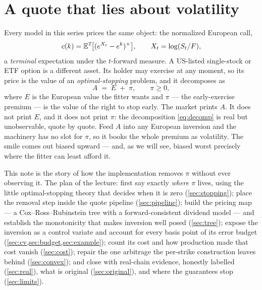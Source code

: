 \documentclass[11pt]{article}
\begin{document}
\newpage
\tableofcontents
\newpage

\section{A quote that lies about volatility}
\label{sec:problem}

Every model in this series prices the same object: the normalized
European call,
\begin{equation}
c(k)=\mathbb{E}^{T}\!\big[(e^{X_t}-e^{k})^+\big],\qquad
X_t=\log(S_t/F),
\label{eq:normcall}
\end{equation}
a \emph{terminal} expectation under the $t$-forward measure.  A US-listed
single-stock or ETF option is a different asset.  Its holder may exercise at
any moment, so its price is the value of an \emph{optimal-stopping} problem,
and it decomposes as
\begin{equation}
A \;=\; E \;+\; \pi,\qquad \pi\ge0,
\label{eq:decomp}
\end{equation}
where $E$ is the European value the fitter wants and $\pi$ --- the
early-exercise premium --- is the value of the right to stop early.  The
market prints $A$.  It does not print $E$, and it does not print $\pi$:
the decomposition \eqref{eq:decomp} is real but unobservable, quote by
quote.  Feed $A$ into any European inversion and the machinery has no slot
for $\pi$, so it books the whole premium as volatility.  The smile comes
out biased upward --- and, as we will see, biased worst precisely where the
fitter can least afford it.

This note is the story of how the implementation removes $\pi$ without ever
observing it.  The plan of the lecture: first say exactly \emph{where}
$\pi$ lives, using the little optimal-stopping theory that decides when it
is zero (\cref{sec:stopping}); place the removal step inside the quote
pipeline (\cref{sec:pipeline}); build the pricing map --- a
Cox--Ross--Rubinstein tree with a forward-consistent dividend model ---
and establish the monotonicity that makes inversion well posed
(\cref{sec:tree}); expose the inversion as a control variate and account
for every basis point of its error budget
(\cref{sec:cv,sec:budget,sec:example}); count its cost and how production
made that cost vanish (\cref{sec:cost}); repair the one arbitrage the
per-strike construction leaves behind (\cref{sec:convex}); and close with
real-chain evidence, honestly labelled (\cref{sec:real}), what is original
(\cref{sec:original}), and where the guarantees stop (\cref{sec:limits}).
\end{document}
